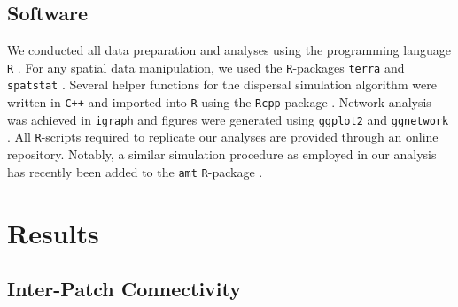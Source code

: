 \documentclass[../FinalThesis.tex]{subfiles}
\begin{document}
\subsection{Software}

We conducted all data preparation and analyses using the programming language
\texttt{R} \citep{RCoreTeam.2023}. For any spatial data manipulation, we used
the \texttt{R}-packages \texttt{terra} \citep{Hijmans.2024} and
\texttt{spatstat} \citep{Baddeley.2015}. Several helper functions for the
dispersal simulation algorithm were written in \texttt{C++} and imported into
\texttt{R} using the \texttt{Rcpp} package \citep{Eddelbuettel.2011}. Network
analysis was achieved in \texttt{igraph} \citep{Csardi.2006} and figures were
generated using \texttt{ggplot2} \citep{Wickham.2024} and \texttt{ggnetwork}
\citep{Briatte.2024}. All \texttt{R}-scripts required to replicate our analyses
are provided through an online repository. Notably, a similar simulation
procedure as employed in our analysis has recently been added to the
\texttt{amt} \texttt{R}-package \citep{Signer.2024}.

\section{Results}
\subsection{Inter-Patch Connectivity}
\end{document}
